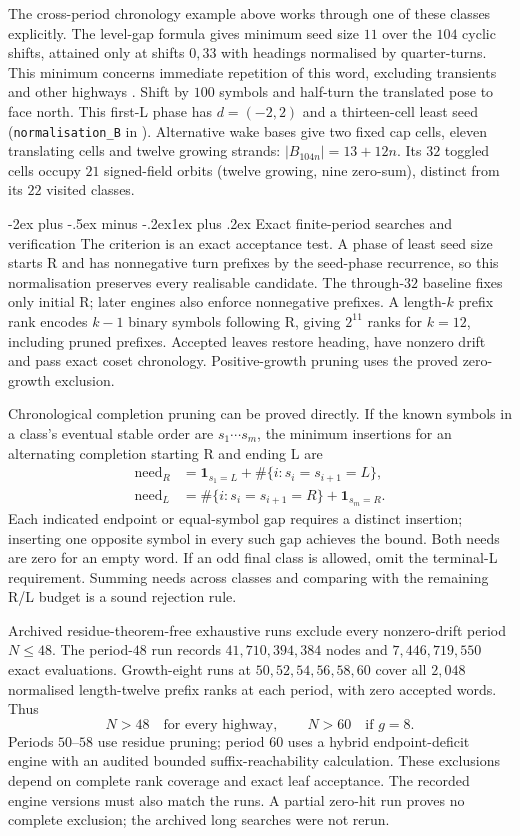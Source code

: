 \documentclass[11pt,letterpaper]{article}
\makeatletter
\renewcommand\section{\@startsection{section}{1}{\z@}%
  {-2ex plus -.5ex minus -.2ex}{1ex plus .2ex}%
  {\normalfont\Large\bfseries}}
\makeatother
\begin{document}
The cross-period chronology example above works through one of these classes explicitly.
The level-gap formula gives minimum seed size $11$ over the $104$
cyclic shifts, attained only at shifts $0,33$ with headings normalised
by quarter-turns. This minimum concerns immediate repetition of this word, excluding
transients and other highways \cite{Repo}.
Shift by $100$ symbols and half-turn the translated pose to face north.
This first-L phase has $d=(-2,2)$ and a thirteen-cell least seed
(\texttt{normalisation\_B} in  \cite{Repo}).
Alternative wake bases give two fixed cap cells, eleven translating cells
and twelve growing strands: $|B_{104n}|=13+12n$. Its $32$ toggled cells
occupy $21$ signed-field orbits (twelve growing, nine zero-sum), distinct
from its $22$ visited classes.

\section{Exact finite-period searches and verification}
The criterion is an exact acceptance test. A phase of least seed size
starts R and has nonnegative turn prefixes by the seed-phase recurrence,
so this normalisation preserves every realisable candidate. The
through-$32$ baseline fixes only initial R; later engines also enforce
nonnegative prefixes. A length-$k$ prefix rank encodes
$k-1$ binary symbols following R, giving $2^{11}$ ranks for $k=12$,
including pruned prefixes. Accepted leaves restore heading, have nonzero
drift and pass exact coset chronology. Positive-growth pruning uses the
proved zero-growth exclusion.

Chronological completion pruning can be proved directly. If the known
symbols in a class's eventual stable order are $s_1\cdots s_m$, the
minimum insertions for an alternating completion starting R and ending L
are
\[
\begin{aligned}
\mathrm{need}_R&=\mathbf1_{s_1=L}+\#\{i:s_i=s_{i+1}=L\},\\
\mathrm{need}_L&=\#\{i:s_i=s_{i+1}=R\}+\mathbf1_{s_m=R}.
\end{aligned}
\]
Each indicated endpoint or equal-symbol gap requires a distinct insertion;
inserting one opposite symbol in every such gap achieves the bound.
Both needs are zero for an empty word. If an odd final class is allowed,
omit the terminal-L requirement. Summing needs across classes and
comparing with the remaining R/L budget is a sound rejection rule.

Archived residue-theorem-free exhaustive runs exclude every nonzero-drift
period $N\le48$. The period-$48$ run records $41{,}710{,}394{,}384$
nodes and $7{,}446{,}719{,}550$ exact evaluations. Growth-eight runs
at $50,52,54,56,58,60$ cover all $2{,}048$ normalised length-twelve
prefix ranks at each period, with zero accepted words. Thus
\[
N>48\quad\text{for every highway},\qquad
N>60\quad\text{if }g=8.
\]
Periods $50$--$58$ use residue pruning; period $60$ uses a hybrid
endpoint-deficit engine with an audited bounded suffix-reachability
calculation. These exclusions depend on complete rank coverage and exact leaf
acceptance. The recorded engine versions must also match the runs. A partial zero-hit run
proves no complete exclusion; the archived long searches were not rerun.
\end{document}
